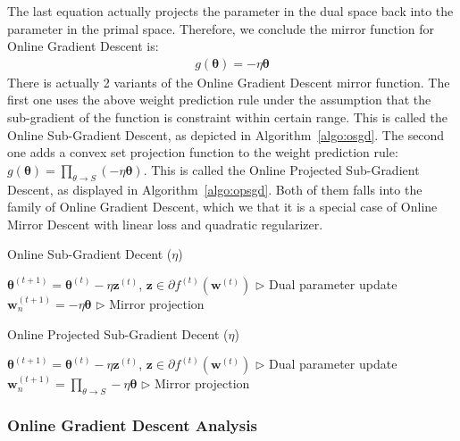 \documentclass[11pt]{article}
\newcommand{\btheta}{\boldsymbol{\theta}}
\newcommand{\bz}{\boldsymbol{z}}
\newcommand{\bw}{\boldsymbol{w}}
\begin{document}
The last equation actually projects the parameter in the dual space back into the parameter in the primal space.
Therefore, we conclude the mirror function for Online Gradient Descent is:
%
\begin{equation*}
\begin{split}
g(\btheta) = -\eta \btheta
\end{split}
\end{equation*}
%
There is actually 2 variants of the Online Gradient Descent mirror function. The first one uses the above weight prediction rule under the assumption that the sub-gradient of the function is constraint within certain range. This is called the Online Sub-Gradient Descent, as depicted in Algorithm~\ref{algo:osgd}. The second one adds a convex set projection function to the weight prediction rule: $g(\btheta) = \prod_{\theta \rightarrow S} (-\eta \btheta)$. This is called the Online Projected Sub-Gradient Descent, as displayed in Algorithm~\ref{algo:opsgd}. Both of them falls into the family of Online Gradient Descent, which we that it is a special case of Online Mirror Descent with linear loss and quadratic regularizer.

\begin{algorithm}[H]
\caption{Online Sub-Gradient Decent ($\eta$)}
\label{algo:osgd}
\begin{algorithmic}[1]
\STATE $\btheta^{(t+1)} =  \btheta^{(t)} - \eta \bz ^{(t)}$, $\bz \in \partial f^{(t)}(\bw^{(t)})$ \hfill $\triangleright$ Dual parameter update
\STATE $\bw_n^{(t+1)} = -\eta \btheta$ \hfill $\triangleright$ Mirror projection
\ENDFOR
\end{algorithmic}
\end{algorithm}


\begin{algorithm}[H]
\caption{Online Projected Sub-Gradient Decent ($\eta$)}
\label{algo:opsgd}
\begin{algorithmic}[1]
\STATE $\btheta^{(t+1)} =  \btheta^{(t)} - \eta \bz ^{(t)}$, $\bz \in \partial f^{(t)}(\bw^{(t)})$ \hfill $\triangleright$ Dual parameter update
\STATE $\bw_n^{(t+1)} = \prod_{\theta \rightarrow S}-\eta \btheta$ \hfill $\triangleright$ Mirror projection
\ENDFOR
\end{algorithmic}
\end{algorithm}

\subsubsection{Online Gradient Descent Analysis}
\end{document}

